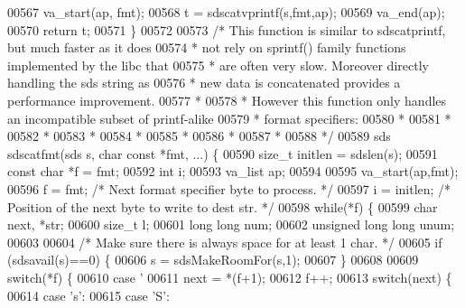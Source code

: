 \begin{DoxyCode}
{{{00567     va\_start(ap, fmt);
00568     t = sdscatvprintf(s,fmt,ap);
00569     va\_end(ap);
00570     \textcolor{keywordflow}{return} t;
00571 \}
00572 
00573 \textcolor{comment}{/* This function is similar to sdscatprintf, but much faster as it does}
00574 \textcolor{comment}{ * not rely on sprintf() family functions implemented by the libc that}
00575 \textcolor{comment}{ * are often very slow. Moreover directly handling the sds string as}
00576 \textcolor{comment}{ * new data is concatenated provides a performance improvement.}
00577 \textcolor{comment}{ *}
00578 \textcolor{comment}{ * However this function only handles an incompatible subset of printf-alike}
00579 \textcolor{comment}{ * format specifiers:}
00580 \textcolor{comment}{ *}
00581 \textcolor{comment}{ * %
00582 \textcolor{comment}{ * %
00583 \textcolor{comment}{ * %
00584 \textcolor{comment}{ * %
00585 \textcolor{comment}{ * %
00586 \textcolor{comment}{ * %
00587 \textcolor{comment}{ * %
00588 \textcolor{comment}{ */}
00589 sds sdscatfmt(sds s, \textcolor{keywordtype}{char} \textcolor{keyword}{const} *fmt, ...) \{
00590     size\_t initlen = sdslen(s);
00591     \textcolor{keyword}{const} \textcolor{keywordtype}{char} *f = fmt;
00592     \textcolor{keywordtype}{int} i;
00593     va\_list ap;
00594 
00595     va\_start(ap,fmt);
00596     f = fmt;    \textcolor{comment}{/* Next format specifier byte to process. */}
00597     i = initlen; \textcolor{comment}{/* Position of the next byte to write to dest str. */}
00598     \textcolor{keywordflow}{while}(*f) \{
00599         \textcolor{keywordtype}{char} next, *str;
00600         size\_t l;
00601         \textcolor{keywordtype}{long} \textcolor{keywordtype}{long} num;
00602         \textcolor{keywordtype}{unsigned} \textcolor{keywordtype}{long} \textcolor{keywordtype}{long} unum;
00603 
00604         \textcolor{comment}{/* Make sure there is always space for at least 1 char. */}
00605         \textcolor{keywordflow}{if} (sdsavail(s)==0) \{
00606             s = sdsMakeRoomFor(s,1);
00607         \}
00608 
00609         \textcolor{keywordflow}{switch}(*f) \{
00610         \textcolor{keywordflow}{case} \textcolor{stringliteral}{'%
00611             next = *(f+1);
00612             f++;
00613             \textcolor{keywordflow}{switch}(next) \{
00614             \textcolor{keywordflow}{case} \textcolor{stringliteral}{'s'}:
00615             \textcolor{keywordflow}{case} \textcolor{stringliteral}{'S'}:
}}}}}}}}}}}
\end{DoxyCode}
